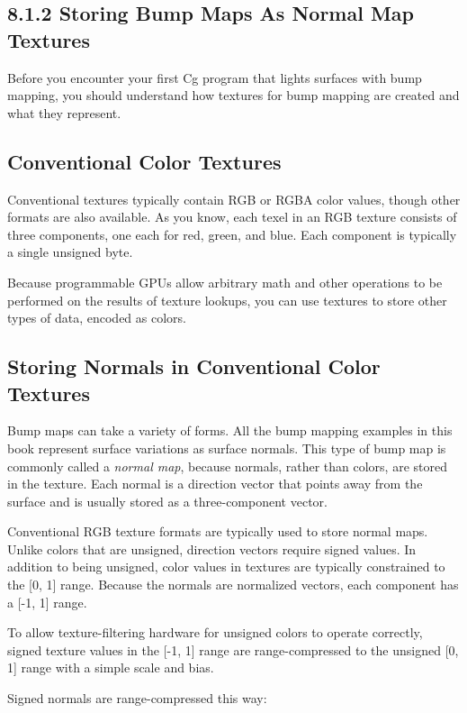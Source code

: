\documentclass[../main.tex]{subfiles}
\begin{document}
\subsection{8.1.2 Storing Bump Maps As Normal Map Textures}

Before you encounter your first Cg program that lights surfaces with bump mapping, you should understand how textures for bump mapping are created and what they represent.

\subsection*{Conventional Color Textures}

Conventional textures typically contain RGB or RGBA color values, though other formats are also available. As you know, each texel in an RGB texture consists of three components, one each for red, green, and blue. Each component is typically a single unsigned byte.

Because programmable GPUs allow arbitrary math and other operations to be performed on the results of texture lookups, you can use textures to store other types of data, encoded as colors.

\subsection*{Storing Normals in Conventional Color Textures}

Bump maps can take a variety of forms. All the bump mapping examples in this book represent surface variations as surface normals. This type of bump map is commonly called a \textit{normal map}, because normals, rather than colors, are stored in the texture. Each normal is a direction vector that points away from the surface and is usually stored as a three-component vector.

Conventional RGB texture formats are typically used to store normal maps. Unlike colors that are unsigned, direction vectors require signed values. In addition to being unsigned, color values in textures are typically constrained to the [0, 1] range. Because the normals are normalized vectors, each component has a [-1, 1] range.

To allow texture-filtering hardware for unsigned colors to operate correctly, signed texture values in the [-1, 1] range are range-compressed to the unsigned [0, 1] range with a simple scale and bias.

Signed normals are range-compressed this way:
\end{document}
